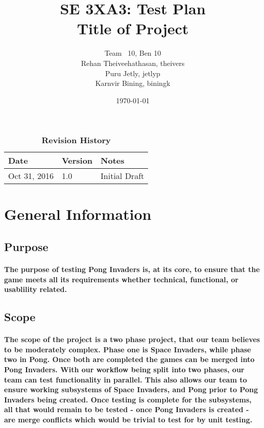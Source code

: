 \documentclass[12pt, titlepage]{article}
\title{SE 3XA3: Test Plan\\Title of Project}
\author{Team \ 10, Ben 10
		\\ Rehan Theiveehathasan, theivers
		\\ Puru Jetly, jetlyp
		\\ Karnvir Bining, biningk
}
\date{\today}
\begin{document}
\maketitle

\tableofcontents
\listoftables
\listoffigures

\begin{table}[bp]
\caption{\bf Revision History}
\begin{tabularx}{\textwidth}{p{3cm}p{2cm}X}
\toprule {\bf Date} & {\bf Version} & {\bf Notes}\\
\midrule
Oct 31, 2016 & 1.0 &  Initial Draft\\
\bottomrule
\end{tabularx}
\end{table}

\newpage


\section{General Information}

\subsection{Purpose}
\paragraph{The purpose of testing Pong Invaders is, at its core, to ensure that
the game meets all its requirements whether technical, functional, or usablility
related.}


\subsection{Scope}
\paragraph{The scope of the project is a two phase project, that our team
believes to be moderately complex. Phase one is Space Invaders, while phase two
in Pong. Once both are completed the games can be merged into Pong Invaders.
With our workflow being split into two phases, our team can test functionality
in parallel. This also allows our team to ensure working subsystems of Space
Invaders, and Pong prior to Pong Invaders being created. Once testing is
complete for the subsystems, all that would remain to be tested - once Pong
Invaders is created - are merge conflicts which would be trivial to test for by
unit testing.}
\end{document}
